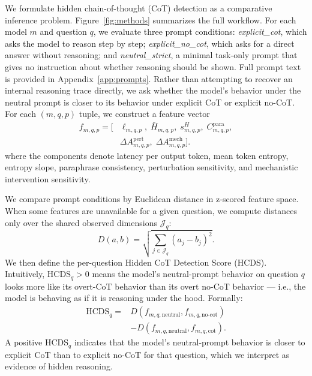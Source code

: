 \documentclass{article}
\theoremstyle{plain}
\theoremstyle{definition}
\theoremstyle{remark}
\begin{document}
We formulate hidden chain-of-thought (CoT) detection as a comparative inference problem. Figure~\ref{fig:methods} summarizes the full workflow. For each model $m$ and question $q$, we evaluate three prompt conditions: \textit{explicit\_cot}, which asks the model to reason step by step; \textit{explicit\_no\_cot}, which asks for a direct answer without reasoning; and \textit{neutral\_strict}, a minimal task-only prompt that gives no instruction about whether reasoning should be shown. Full prompt text is provided in Appendix~\ref{app:prompts}. Rather than attempting to recover an internal reasoning trace directly, we ask whether the model's behavior under the neutral prompt is closer to its behavior under explicit CoT or explicit no-CoT. For each $(m,q,p)$ tuple, we construct a feature vector
\[
\begin{aligned}
f_{m,q,p} = \bigl[&\ell_{m,q,p},\; \bar{H}_{m,q,p},\; s^{H}_{m,q,p},\; C^{\mathrm{para}}_{m,q,p},\\
&\Delta A^{\mathrm{pert}}_{m,q,p},\; \Delta A^{\mathrm{mech}}_{m,q,p}\bigr].
\end{aligned}
\]
where the components denote latency per output token, mean token entropy, entropy slope, paraphrase consistency, perturbation sensitivity, and mechanistic intervention sensitivity.

We compare prompt conditions by Euclidean distance in z-scored feature space. When some features are unavailable for a given question, we compute distances only over the shared observed dimensions $\mathcal{J}_q$:
\[
D(a,b) = \sqrt{\sum_{j \in \mathcal{J}_q} (a_j - b_j)^2}.
\]
We then define the per-question Hidden CoT Detection Score (HCDS). Intuitively, $\mathrm{HCDS}_q > 0$ means the model's neutral-prompt behavior on question $q$ looks more like its overt-CoT behavior than its overt no-CoT behavior --- i.e., the model is behaving as if it is reasoning under the hood. Formally:
\begin{equation}
\begin{aligned}
\mathrm{HCDS}_q ={}& D\!\left(f_{m,q,\mathrm{neutral}}, f_{m,q,\mathrm{no\text{-}cot}}\right) \\
&- D\!\left(f_{m,q,\mathrm{neutral}}, f_{m,q,\mathrm{cot}}\right).
\end{aligned}
\label{eq:hcds-q}
\end{equation}
A positive $\mathrm{HCDS}_q$ indicates that the model's neutral-prompt behavior is closer to explicit CoT than to explicit no-CoT for that question, which we interpret as evidence of hidden reasoning.
\end{document}
